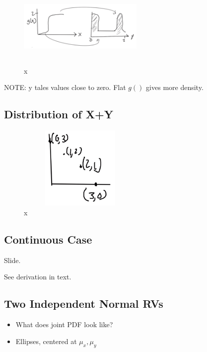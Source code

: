 
\begin{figure}[ht]
\centering
\includegraphics[width=6cm, height=4cm]{images/L11/strictly_monotonic.jpeg}
\caption{x}
\end{figure}

NOTE: y tales values close to zero. Flat $g()$ gives more density.

\subsection{Distribution of X+Y}


\begin{figure}[ht]
\centering
\includegraphics[width=6cm, height=4cm]{images/L11/dist_x_y.jpeg}
\caption{x}
\end{figure}

\subsection{Continuous Case}


Slide.

See derivation in text.

\subsection{Two Independent Normal RVs}


\begin{itemize}
    \item What does joint PDF look like?
    \item Ellipses, centered at $\mu_x, \mu_y$
\end{itemize}

